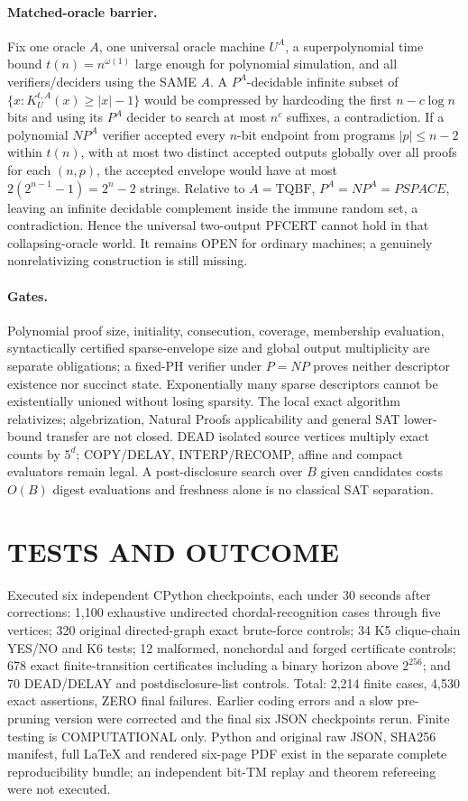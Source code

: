 \documentclass[11pt]{article}
\begin{document}
\paragraph{Matched-oracle barrier.} Fix one oracle $A$, one universal oracle machine $U^A$, a superpolynomial time bound $t(n)=n^{\omega(1)}$ large enough for polynomial simulation, and all verifiers/deciders using the SAME $A$. A $P^A$-decidable infinite subset of $\{x:K_U^{t,A}(x)\ge |x|-1\}$ would be compressed by hardcoding the first $n-c\log n$ bits and using its $P^A$ decider to search at most $n^c$ suffixes, a contradiction. If a polynomial $NP^A$ verifier accepted every $n$-bit endpoint from programs $|p|\le n-2$ within $t(n)$, with at most two distinct accepted outputs globally over all proofs for each $(n,p)$, the accepted envelope would have at most $2(2^{n-1}-1)=2^n-2$ strings. Relative to $A=\mathrm{TQBF}$, $P^A=NP^A=PSPACE$, leaving an infinite decidable complement inside the immune random set, a contradiction. Hence the universal two-output PFCERT cannot hold in that collapsing-oracle world. It remains OPEN for ordinary machines; a genuinely nonrelativizing construction is still missing.
\paragraph{Gates.} Polynomial proof size, initiality, consecution, coverage, membership evaluation, syntactically certified sparse-envelope size and global output multiplicity are separate obligations; a fixed-PH verifier under $P=NP$ proves neither descriptor existence nor succinct state. Exponentially many sparse descriptors cannot be existentially unioned without losing sparsity. The local exact algorithm relativizes; algebrization, Natural Proofs applicability and general SAT lower-bound transfer are not closed. DEAD isolated source vertices multiply exact counts by $5^d$; COPY/DELAY, INTERP/RECOMP, affine and compact evaluators remain legal. A post-disclosure search over $B$ given candidates costs $O(B)$ digest evaluations and freshness alone is no classical SAT separation.
\section{TESTS AND OUTCOME}
Executed six independent CPython checkpoints, each under 30 seconds after corrections: 1,100 exhaustive undirected chordal-recognition cases through five vertices; 320 original directed-graph exact brute-force controls; 34 K5 clique-chain YES/NO and K6 tests; 12 malformed, nonchordal and forged certificate controls; 678 exact finite-transition certificates including a binary horizon above $2^{256}$; and 70 DEAD/DELAY and postdisclosure-list controls. Total: 2,214 finite cases, 4,530 exact assertions, ZERO final failures. Earlier coding errors and a slow pre-pruning version were corrected and the final six JSON checkpoints rerun. Finite testing is COMPUTATIONAL only. Python and original raw JSON, SHA256 manifest, full LaTeX and rendered six-page PDF exist in the separate complete reproducibility bundle; an independent bit-TM replay and theorem refereeing were not executed.
\end{document}
